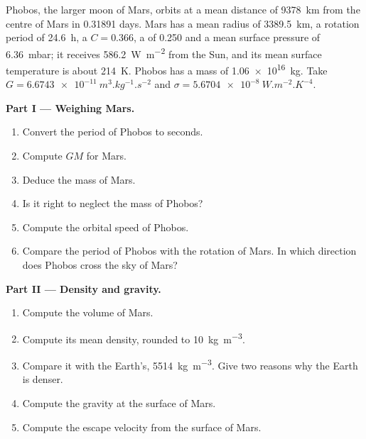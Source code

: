 \begin{problem}
\label{pb:b1:comparative-planetology:1}
Phobos, the larger moon of Mars, orbits at a mean distance of
\qty{9378}{km} from the centre of Mars in \num{0.31891} days. Mars has a mean
radius of \qty{3389.5}{km}, a rotation period of \qty{24.6}{h}, a
 $C = 0.366$, a  of 0.250 and a mean
surface pressure of \qty{6.36}{mbar}; it receives \qty{586.2}{W.m^{-2}} from
the Sun, and its mean surface temperature is about \qty{214}{K}. Phobos has
a mass of \qty{1.06e16}{kg}. Take $G = \qty{6.6743e-11}{m^3.kg^{-1}.s^{-2}}$
and $\sigma = \qty{5.6704e-8}{W.m^{-2}.K^{-4}}$.

\medskip
\noindent\textbf{Part I --- Weighing Mars.}
\begin{enumerate}
  \item Convert the period of Phobos to seconds.
  \item Compute $GM$ for Mars.
  \item Deduce the mass of Mars.
  \item Is it right to neglect the mass of Phobos?
  \item Compute the orbital speed of Phobos.
  \item Compare the period of Phobos with the rotation of Mars. In which
        direction does Phobos cross the sky of Mars?
\end{enumerate}

\medskip
\noindent\textbf{Part II --- Density and gravity.}
\begin{enumerate}[resume]
  \item Compute the volume of Mars.
  \item Compute its mean density, rounded to \qty{10}{kg.m^{-3}}.
  \item Compare it with the Earth's, \qty{5514}{kg.m^{-3}}. Give two
        reasons why the Earth is denser.
  \item Compute the gravity at the surface of Mars.
  \item Compute the escape velocity from the surface of Mars.
\end{enumerate}


\end{problem}
